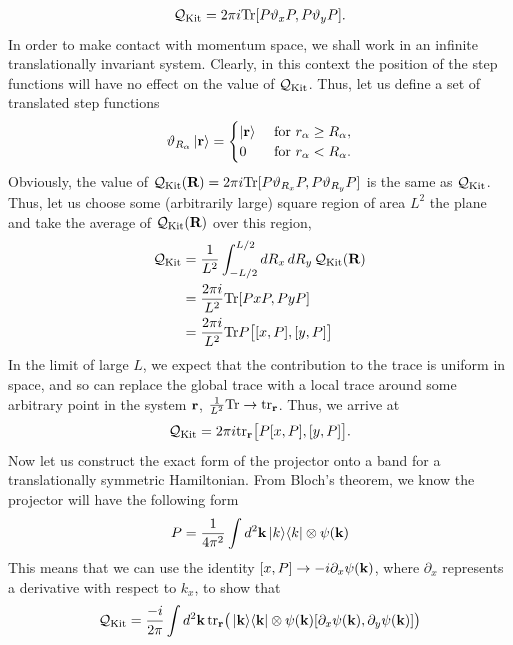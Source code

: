 \begin{align}\label{eqn:qkit_step_functions}
    \mathcal Q_{\textup{Kit}} = 2\pi i\textup{Tr} [P \vartheta_xP, P \vartheta_yP ].
\end{align}
In order to make contact with momentum space, we shall work in an infinite translationally invariant system. Clearly, in this context the position of the step functions will have no effect on the value of $\mathcal Q_{\textup{Kit}}$. Thus, let us define a set of translated step functions
\begin{align}
    \vartheta_{R_\alpha} \ket{\textbf r} = 
    \begin{cases}
        \ket {\textbf r}&\textup{ for }r_{\alpha} \geq R_\alpha,\\ 
        0&\textup{ for }r_{\alpha} < R_\alpha.
    \end{cases}
\end{align} 
Obviously, the value of $\mathcal Q_{\textup{Kit}}(\textbf R) = 2\pi i\textup{Tr} [P \vartheta_{R_x} P, P \vartheta_{R_y}P ]$ is the same as $\mathcal Q_{\textup{Kit}}$. Thus, let us choose some (arbitrarily large) square region of area $L^2$ the plane and take the average of $\mathcal Q_{\textup{Kit}}(\textbf R)$ over this region, 
\begin{align}
    \mathcal Q_{\textup{Kit}} &= \frac{1}{L^2} \int_{-L/2}^{L/2} dR_x\, dR_y\, \mathcal Q_{\textup{Kit}}(\textbf R)  \\ 
    & = \frac{2\pi i}{L^2} \textup{Tr} [ PxP, PyP ] \\ 
    & = \frac{2\pi i}{L^2} \textup{Tr} P \big[ [x,P],[y,P] \big ] 
\end{align}
In the limit of large $L$, we expect that the contribution to the trace is uniform in space, and so can replace the global trace with a local trace around some arbitrary point in the system $\textbf r$, $\frac1 {L^2} \textup{Tr} \rightarrow \textup{tr}_{\textbf{r}} $. Thus, we arrive at 
\begin{align}\label{eqn:chern_marker_from_kitaev}
    \mathcal Q_{\textup{Kit}} = 2\pi i \textup{tr} _{\textbf{r}} \big [P[x,P],[y,P]\big ]. 
\end{align}
Now let us construct the exact form of the projector onto a band for a translationally symmetric Hamiltonian. From Bloch's theorem, we know the projector will have the following form
\begin{align}
    P = \frac{1}{4\pi^2}\int d^2 \textbf k \ket{k}\!\bra{k} \otimes \psi(\textbf k)
\end{align}
This means that we can use the identity $[x, P] \rightarrow -i \partial_x \psi(\textbf k)$, where $\partial_x$ represents a derivative with respect to $k_x$, to show that 
\begin{align}
    \mathcal Q_{\textup{Kit}} = \frac{-i}{2\pi} \int d^2 \textbf k \, 
    \textup{tr} _{\textbf{r}} \big (\ket{\textbf k}\!\bra{\textbf k} \otimes
        \psi(\textbf k) [\partial_x \psi(\textbf k), \partial_y \psi(\textbf k)]
    \big )
\end{align}
